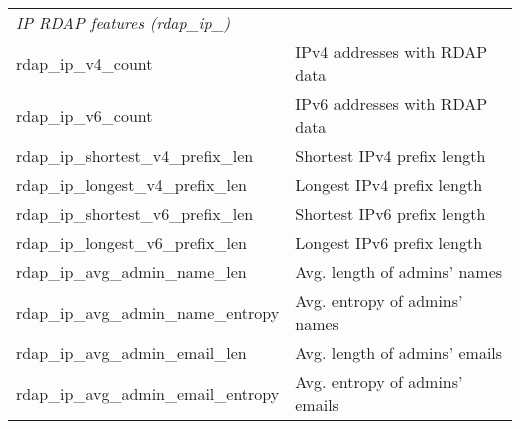 \begin{longtable}{@{}ll@{}}
\midrule
\multicolumn{2}{l}{\emph{IP RDAP features (rdap\_ip\_)}} \\
rdap\_ip\_v4\_count & IPv4 addresses with RDAP data \\
rdap\_ip\_v6\_count & IPv6 addresses with RDAP data \\
rdap\_ip\_shortest\_v4\_prefix\_len & Shortest IPv4 prefix length \\
rdap\_ip\_longest\_v4\_prefix\_len & Longest IPv4 prefix length \\
rdap\_ip\_shortest\_v6\_prefix\_len & Shortest IPv6 prefix length \\
rdap\_ip\_longest\_v6\_prefix\_len & Longest IPv6 prefix length \\
rdap\_ip\_avg\_admin\_name\_len & Avg. length of admins' names \\
rdap\_ip\_avg\_admin\_name\_entropy & Avg. entropy of admins' names \\
rdap\_ip\_avg\_admin\_email\_len & Avg. length of admins' emails \\
rdap\_ip\_avg\_admin\_email\_entropy & Avg. entropy of admins' emails \\


\end{longtable}
